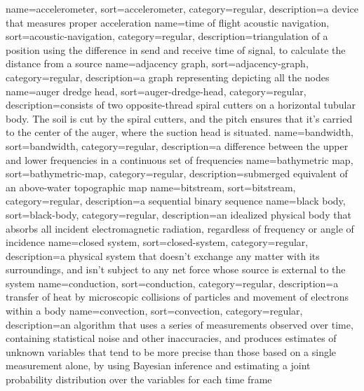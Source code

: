 %
{%
  name={accelerometer},%
  sort={accelerometer},%
  category={regular},%
  description={a device that measures proper acceleration}%
}
%
{%
  name={time of flight acoustic navigation},%
  sort={acoustic-navigation},%
  category={regular},%
  description={triangulation of a position using the difference in send and receive time of signal, to calculate the distance from a source}%
}
%
{%
  name={adjacency graph},%
  sort={adjacency-graph},%
  category={regular},%
  description={a graph representing depicting all the nodes}%
}
%
{%
  name={auger dredge head},%
  sort={auger-dredge-head},%
  category={regular},%
  description={consists of two opposite-thread spiral cutters on a horizontal tubular body. The soil is cut by the spiral cutters, and the pitch ensures that it's carried to the center of the auger, where the suction head is situated.}%
}
%
{%
  name={bandwidth},%
  sort={bandwidth},%
  category={regular},%
  description={a difference between the upper and lower frequencies in a continuous set of frequencies}%
}
%
{%
  name={bathymetric map},%
  sort={bathymetric-map},%
  category={regular},%
  description={submerged equivalent of an above-water topographic map}%
}
%
{%
  name={bitstream},%
  sort={bitstream},%
  category={regular},%
  description={a sequential binary sequence}%
}
%
{%
  name={black body},%
  sort={black-body},%
  category={regular},%
  description={an idealized physical body that absorbs all incident electromagnetic radiation, regardless of frequency or angle of incidence}%
}
%
{%
  name={closed system},%
  sort={closed-system},%
  category={regular},%
  description={a physical system that doesn't exchange any matter with its surroundings, and isn't subject to any net force whose source is external to the system}%
}
%
{%
  name={conduction},%
  sort={conduction},%
  category={regular},%
  description={a transfer of heat by microscopic collisions of particles and movement of electrons within a body}%
}
%
{%
  name={convection},%
  sort={convection},%
  category={regular},%
  description={an algorithm that uses a series of measurements observed over time, containing statistical noise and other inaccuracies, and produces estimates of unknown variables that tend to be more precise than those based on a single measurement alone, by using Bayesian inference and estimating a joint probability distribution over the variables for each time frame}%
}
